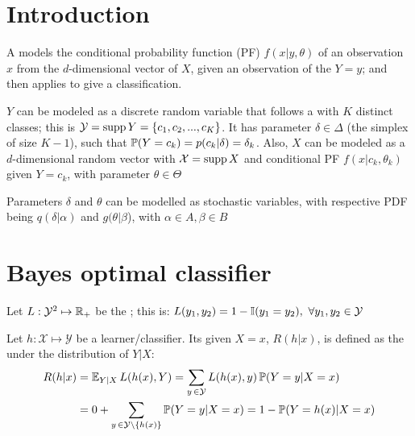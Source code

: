 
\section{Introduction}

A  models the conditional probability function (PF) $f(x|y,{\theta})$ of an observation $x$ from the $d$-dimensional vector of  $X$, given an observation of the  $Y=y$; and then applies  to give a classification. 

$Y$ can be modeled as a discrete random variable that follows a 
 with $K$ distinct classes; this is $ \mathcal{Y}=\operatorname{supp}{Y}=\{c_1,c_2,...,c_K\}$. It has parameter $\delta\in\Delta$ (the simplex of size $K-1$), such that $\operatorname{\mathbb{P}}(Y=c_k)=p(c_k|\delta)=\delta_k$. Also, $X$ can be modeled as a $d$-dimensional random vector with $\mathcal{X}=\operatorname{supp} X$ and conditional PF $f(x|c_k,{\theta}_k)$ given $Y=c_k$, with parameter $\theta\in\Theta$

Parameters $\delta$ and $\theta$ can be modelled as stochastic variables, with respective PDF being $q(\delta|\alpha)$ and $g(\theta|\beta$), with  $\alpha\in A,\beta\in B$


\section{Bayes optimal classifier}

Let $L:\mathcal{Y}^2\mapsto\operatorname{\mathbb{R}}_+$ be the ; this is: $L(y_1,y_2) = 1-\I(y_1=y_2),\ \forall y_1,y_2\in\mathcal{Y}$

Let $h:\mathcal{X}\mapsto\mathcal{Y}$ be a {learner}/{classifier}. Its  given $X=x$, $R(h|x)$, is defined as the  under the distribution of $Y|X$:
\begin{align*}
    R(h|x) &= \operatorname{\mathbb{E}}_{Y|X} L(h(x),Y) = \sum_{y\,\in\mathcal{Y}} L(h({x}),y)\operatorname{\mathbb{P}}(Y=y|X={x}) \\
    &= 0+\sum_{y\,\in\mathcal{Y}\setminus\{h({x})\} } \operatorname{\mathbb{P}}(Y=y|X={x}) = 1 - \operatorname{\mathbb{P}}(Y=h(x)|X={x})
\end{align*}

